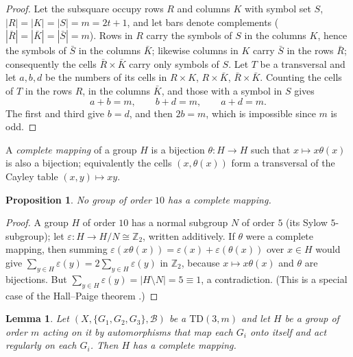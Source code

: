 \documentclass[11pt]{article}
\newtheorem{proposition}[theorem]{Proposition}
\newtheorem{lemma}[theorem]{Lemma}
\theoremstyle{remark}
\newcommand{\Z}{\mathbb{Z}}
\newcommand{\TD}{\mathrm{TD}}
\begin{document}
\begin{proof}
Let the subsquare occupy rows $R$ and columns $K$ with symbol set $S$,
$|R|=|K|=|S|=m=2t+1$, and let bars denote complements ($|\bar R|=|\bar K|=|\bar S|=m$).
Rows in $R$ carry the symbols of $S$ in the columns $K$, hence the symbols of
$\bar S$ in the columns $\bar K$; likewise columns in $K$ carry $\bar S$ in the rows
$\bar R$; consequently the cells $\bar R\times\bar K$ carry only symbols of $S$.  Let $T$
be a transversal and let $a,b,d$ be the numbers of its cells in $R\times K$,
$R\times\bar K$, $\bar R\times\bar K$.  Counting the cells of $T$ in the rows $R$, in the
columns $\bar K$, and those with a symbol in $S$ gives
\[
a+b=m,\qquad b+d=m,\qquad a+d=m .
\]
The first and third give $b=d$, and then $2b=m$, which is impossible since $m$ is odd.
\end{proof}

A \emph{complete mapping} of a group $H$ is a bijection $\theta\colon H\to H$ such that
$x\mapsto x\theta(x)$ is also a bijection; equivalently the cells $(x,\theta(x))$ form a
transversal of the Cayley table $(x,y)\mapsto xy$.

\begin{proposition}\label{prop:cm}
No group of order $10$ has a complete mapping.
\end{proposition}

\begin{proof}
A group $H$ of order $10$ has a normal subgroup $N$ of order $5$ (its Sylow $5$-subgroup);
let $\varepsilon\colon H\to H/N\cong\Z_2$, written additively.  If $\theta$ were a complete
mapping, then summing $\varepsilon(x\theta(x))=\varepsilon(x)+\varepsilon(\theta(x))$ over
$x\in H$ would give $\sum_{y\in H}\varepsilon(y)=2\sum_{y\in H}\varepsilon(y)$ in $\Z_2$,
because $x\mapsto x\theta(x)$ and $\theta$ are bijections.  But
$\sum_{y\in H}\varepsilon(y)=|H\setminus N|=5\equiv 1$, a contradiction.  (This is a special
case of the Hall--Paige theorem \cite{HP55}.)
\end{proof}

\begin{lemma}\label{lem:dm}
Let $(X,\{G_1,G_2,G_3\},\mathcal B)$ be a $\TD(3,m)$ and let $H$ be a group of order $m$
acting on it by automorphisms that map each $G_i$ onto itself and act regularly on each
$G_i$.  Then $H$ has a complete mapping.
\end{lemma}
\end{document}
